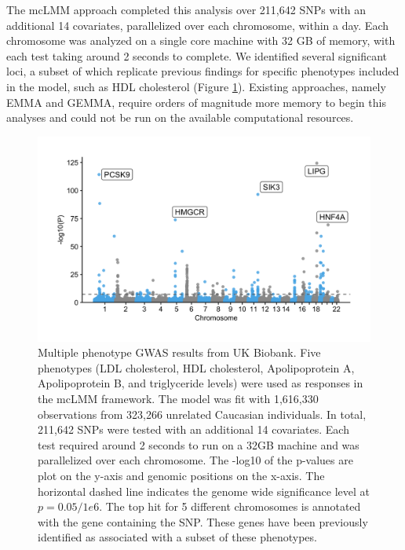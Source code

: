         The mcLMM approach completed this analysis over 211,642 SNPs with an additional 14 covariates, parallelized over each chromosome, within a day. Each chromosome was analyzed on a single core machine with 32 GB of memory, with each test taking around 2 seconds to complete. We identified several significant loci, a subset of which replicate previous findings for specific phenotypes included in the model, such as HDL cholesterol \cite{Wojcik} (Figure \ref{fig:fig4}). Existing approaches, namely EMMA and GEMMA, require orders of magnitude more memory to begin this analyses and could not be run on the available computational resources.
        
        \begin{figure}
            \centering
            \includegraphics[width=\textwidth]{chapter3/figures/Figure_4.png}
            \caption{Multiple phenotype GWAS results from UK Biobank. Five phenotypes (LDL cholesterol, HDL cholesterol, Apolipoprotein A, Apolipoprotein B, and triglyceride levels) were used as responses in the mcLMM framework. The model was fit with 1,616,330 observations from 323,266 unrelated Caucasian individuals. In total, 211,642 SNPs were tested with an additional 14 covariates. Each test required around 2 seconds to run on a 32GB machine and was parallelized over each chromosome. The -log10 of the p-values are plot on the y-axis and genomic positions on the x-axis. The horizontal dashed line indicates the genome wide significance level at $p=0.05/1e6$. The top hit for 5 different chromosomes is annotated with the gene containing the SNP. These genes have been previously identified as associated with a subset of these phenotypes.}
            \label{fig:fig4}
        \end{figure}
